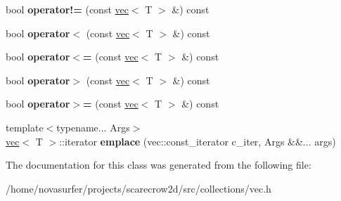 \begin{DoxyCompactItemize}
\item 
\mbox{\label{classsc2d_1_1vec_ac8cc26445a265b01bb91d4e1d9761ddd}} 
bool {\bfseries operator!=} (const \hyperlink{classsc2d_1_1vec}{vec}$<$ T $>$ \&) const
\item 
\mbox{\label{classsc2d_1_1vec_abfa83631155411bcbee637fda8b550f9}} 
bool {\bfseries operator$<$} (const \hyperlink{classsc2d_1_1vec}{vec}$<$ T $>$ \&) const
\item 
\mbox{\label{classsc2d_1_1vec_ad75a494b7d7dc7186b6a0d7168f62413}} 
bool {\bfseries operator$<$=} (const \hyperlink{classsc2d_1_1vec}{vec}$<$ T $>$ \&) const
\item 
\mbox{\label{classsc2d_1_1vec_a22cad5f6bcd649d67d9f25ee42559c05}} 
bool {\bfseries operator$>$} (const \hyperlink{classsc2d_1_1vec}{vec}$<$ T $>$ \&) const
\item 
\mbox{\label{classsc2d_1_1vec_ab5dd148da364716d3c2372b61941be2b}} 
bool {\bfseries operator$>$=} (const \hyperlink{classsc2d_1_1vec}{vec}$<$ T $>$ \&) const
\item 
\mbox{\label{classsc2d_1_1vec_ab9a8ecbae50623509eaa22e5eae36b1a}} 
{\footnotesize template$<$typename... Args$>$ }\\\hyperlink{classsc2d_1_1vec}{vec}$<$ T $>$\+::iterator {\bfseries emplace} (vec\+::const\+\_\+iterator c\+\_\+iter, Args \&\&... args)
\end{DoxyCompactItemize}


The documentation for this class was generated from the following file\+:\begin{DoxyCompactItemize}
\item 
/home/novasurfer/projects/scarecrow2d/src/collections/vec.\+h\end{DoxyCompactItemize}

